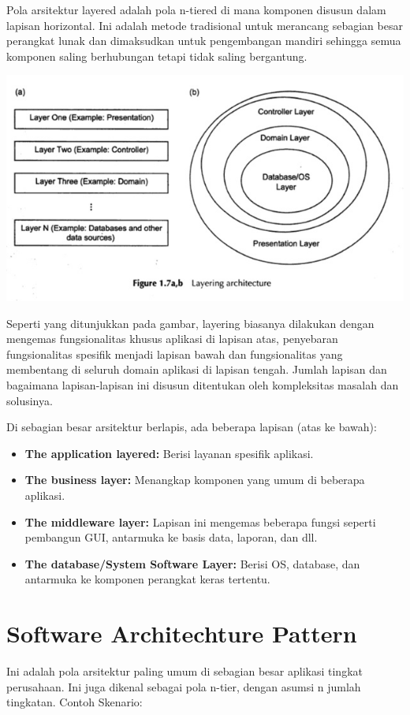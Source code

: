 \documentclass[a4paper,12pt]{article}
\begin{document}
Pola arsitektur layered adalah pola n-tiered di mana komponen disusun dalam lapisan horizontal. Ini adalah metode tradisional untuk merancang sebagian besar perangkat lunak dan dimaksudkan untuk pengembangan mandiri sehingga semua komponen saling berhubungan tetapi tidak saling bergantung.

\includegraphics{Img/Layering Architecture.jpg}

Seperti yang ditunjukkan pada gambar, layering biasanya dilakukan dengan mengemas fungsionalitas khusus aplikasi di lapisan atas, penyebaran fungsionalitas spesifik menjadi lapisan bawah dan fungsionalitas yang membentang di seluruh domain aplikasi di lapisan tengah. Jumlah lapisan dan bagaimana lapisan-lapisan ini disusun ditentukan oleh kompleksitas masalah dan solusinya.

Di sebagian besar arsitektur berlapis, ada beberapa lapisan (atas ke bawah):

\begin{itemize}
	\item \textbf{The application layered:} Berisi layanan spesifik aplikasi.
	\item \textbf{The business layer:} Menangkap komponen yang umum di beberapa aplikasi.
	\item \textbf{The middleware layer:} Lapisan ini mengemas beberapa fungsi seperti pembangun GUI, antarmuka ke basis data, laporan, dan dll.
	\item \textbf{The database/System Software Layer:} Berisi OS, database, dan antarmuka ke komponen perangkat keras tertentu.
\end{itemize}


\section*{Software Architechture Pattern}
Ini adalah pola arsitektur paling umum di sebagian besar aplikasi tingkat perusahaan. Ini juga dikenal sebagai pola n-tier, dengan asumsi n jumlah tingkatan. Contoh Skenario:
\end{document}
